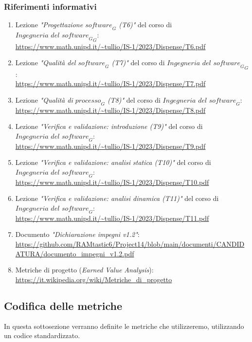 \subsubsection{Riferimenti informativi}
\label{sec:rif_inf}
\begin{enumerate}
    \item Lezione \emph{"Progettazione $\textit{software}_G$ (T6)"} del corso di $\textit{Ingegneria del $\textit{software}_G$}_G$: \\
    \url{https://www.math.unipd.it/~tullio/IS-1/2023/Dispense/T6.pdf}
    \item Lezione \emph{"Qualità del $\textit{software}_G$ (T7)"} del corso di $\textit{Ingegneria del $\textit{software}_G$}_G$: \\
    \url{https://www.math.unipd.it/~tullio/IS-1/2023/Dispense/T7.pdf}
    \item Lezione \emph{"Qualità di $\textit{processo}_G$ (T8)"} del corso di $\textit{Ingegneria del software}_G$: \\
    \url{https://www.math.unipd.it/~tullio/IS-1/2023/Dispense/T8.pdf}
    \item Lezione \emph{"Verifica e validazione: introduzione (T9)"} del corso di $\textit{Ingegneria del software}_G$: \\
    \url{https://www.math.unipd.it/~tullio/IS-1/2023/Dispense/T9.pdf}
    \item Lezione \emph{"Verifica e validazione: analisi statica (T10)"} del corso di $\textit{Ingegneria del software}_G$: \\
    \url{https://www.math.unipd.it/~tullio/IS-1/2023/Dispense/T10.pdf}
    \item Lezione \emph{"Verifica e validazione: analisi dinamica (T11)"} del corso di $\textit{Ingegneria del software}_G$: \\
    \url{https://www.math.unipd.it/~tullio/IS-1/2023/Dispense/T11.pdf}
     \item Documento \emph{"Dichiarazione impegni v1.2"}: \\ \url{https://github.com/RAMtastic6/Project14/blob/main/documenti/CANDIDATURA/documento_impegni_v1.2.pdf}
     \item Metriche di progetto (\emph{Earned Value Analysis}):\\
     \url{https://it.wikipedia.org/wiki/Metriche_di_progetto}
\end{enumerate}
\subsection{Codifica delle metriche}
In questa sottosezione verranno definite le metriche che utilizzeremo, utilizzando un codice standardizzato.

